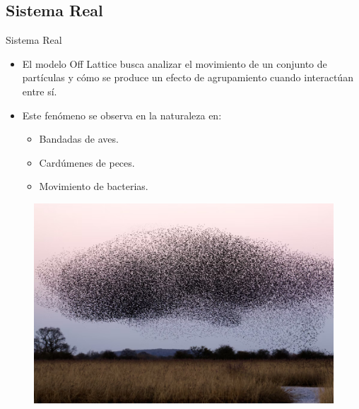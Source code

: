 \documentclass{beamer}
\begin{document}
    \subsection{Sistema Real}

    \begin{frame}{Sistema Real}
        \begin{itemize}
            \item
            El modelo Off Lattice busca analizar el movimiento de un conjunto de partículas y cómo se produce un efecto
            de agrupamiento cuando interactúan entre sí.
        \end{itemize}
        \begin{minipage}[t]{0.5\textwidth}
            \begin{itemize}
                \item
                Este fenómeno se observa en la naturaleza en:
                \begin{itemize}
                    \item Bandadas de aves.
                    \item Cardúmenes de peces.
                    \item Movimiento de bacterias.
                \end{itemize}
            \end{itemize}
        \end{minipage}
        \begin{minipage}[t]{0.45\textwidth}
            \begin{figure}[H]
                \centering
                \includegraphics[width=\linewidth]{./bandadas_de_aves}
                \label{fig:bandadas_de_aves}
            \end{figure}
        \end{minipage}
    \end{frame}
\end{document}
